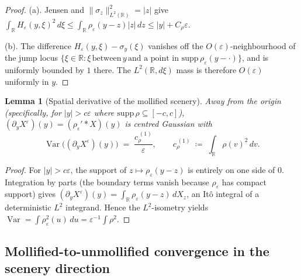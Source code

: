 \documentclass[11pt,reqno]{amsart}
\theoremstyle{plain}
\newtheorem{lemma}[theorem]{Lemma}
\theoremstyle{definition}
\theoremstyle{remark}
\newcommand{\R}{\mathbb{R}}
\DeclareMathOperator{\Var}{Var}
\begin{document}
\begin{proof}
(a). Jensen and $\|\sigma_z\|_{L^{2}(\R)}^{2}=|z|$ give
$\int_\R H_\varepsilon(y,\xi)^{2}\,d\xi\le
\int_\R\rho_\varepsilon(y-z)|z|\,dz\le|y|+C_\rho\varepsilon$.

(b). The difference $H_\varepsilon(y,\xi)-\sigma_y(\xi)$ vanishes off the
$O(\varepsilon)$-neighbourhood of the jump locus
$\{\xi\in\R:\xi\,\text{between}\,y\,\text{and a point in supp}\,\rho_\varepsilon(y-\cdot)\}$,
and is uniformly bounded by $1$ there. The $L^{2}(\R,d\xi)$ mass is
therefore $O(\varepsilon)$ uniformly in $y$.
\end{proof}

\begin{lemma}[Spatial derivative of the mollified scenery]\label{lem:moll-eps-inv}
Away from the origin (specifically, for $|y|>c\varepsilon$ where
$\mathrm{supp}\,\rho\subseteq[-c,c]$),
$(\partial_y X^\varepsilon)(y)=(\rho_\varepsilon'*X)(y)$ is centred
Gaussian with
\[
  \Var\bigl((\partial_y X^\varepsilon)(y)\bigr)
  \;=\;\frac{c_\rho^{\,(1)}}{\varepsilon},
  \qquad c_\rho^{\,(1)}\;\coloneqq\;\int_\R\rho(v)^{2}\,dv.
\]
\end{lemma}

\begin{proof}
For $|y|>c\varepsilon$, the support of $z\mapsto\rho_\varepsilon(y-z)$ is
entirely on one side of $0$. Integration by parts (the boundary terms
vanish because $\rho_\varepsilon$ has compact support) gives
$(\partial_y X^\varepsilon)(y)=\int_\R\rho_\varepsilon(y-z)\,dX_z$, an
It\^o integral of a deterministic $L^{2}$ integrand. Hence the
$L^{2}$-isometry yields
$\Var=\int\rho_\varepsilon^{2}(u)\,du=\varepsilon^{-1}\int\rho^{2}$.
\end{proof}

\subsection*{Mollified-to-unmollified convergence in the scenery direction}
\end{document}

